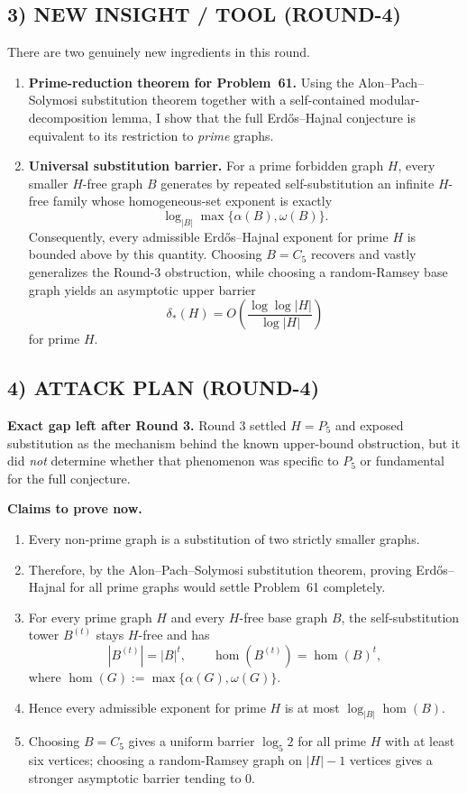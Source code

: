 \subsection*{3) NEW INSIGHT / TOOL (ROUND-4)}
There are two genuinely new ingredients in this round.

\begin{enumerate}
\item \textbf{Prime-reduction theorem for Problem~61.}
Using the Alon--Pach--Solymosi substitution theorem together with a self-contained modular-decomposition lemma, I show that the full Erd\H{o}s--Hajnal conjecture is equivalent to its restriction to \emph{prime} graphs.

\item \textbf{Universal substitution barrier.}
For a prime forbidden graph $H$, every smaller $H$-free graph $B$ generates by repeated self-substitution an infinite $H$-free family whose homogeneous-set exponent is exactly
\[
\log_{|B|}\max\{\alpha(B),\omega(B)\}.
\]
Consequently, every admissible Erd\H{o}s--Hajnal exponent for prime $H$ is bounded above by this quantity.
Choosing $B=C_5$ recovers and vastly generalizes the Round-3 obstruction, while choosing a random-Ramsey base graph yields an asymptotic upper barrier
\[
\delta_*(H)=O\!\left(\frac{\log\log |H|}{\log |H|}\right)
\]
for prime $H$.
\end{enumerate}

\subsection*{4) ATTACK PLAN (ROUND-4)}
\textbf{Exact gap left after Round 3.}
Round 3 settled $H=P_5$ and exposed substitution as the mechanism behind the known upper-bound obstruction, but it did \emph{not} determine whether that phenomenon was specific to $P_5$ or fundamental for the full conjecture.

\textbf{Claims to prove now.}
\begin{enumerate}
\item Every non-prime graph is a substitution of two strictly smaller graphs.
\item Therefore, by the Alon--Pach--Solymosi substitution theorem, proving Erd\H{o}s--Hajnal for all prime graphs would settle Problem~61 completely.
\item For every prime graph $H$ and every $H$-free base graph $B$, the self-substitution tower $B^{(t)}$ stays $H$-free and has
\[
|B^{(t)}|=|B|^t,\qquad \hom(B^{(t)})=\hom(B)^t,
\]
where $\hom(G):=\max\{\alpha(G),\omega(G)\}$.
\item Hence every admissible exponent for prime $H$ is at most $\log_{|B|}\hom(B)$.
\item Choosing $B=C_5$ gives a uniform barrier $\log_5 2$ for all prime $H$ with at least six vertices; choosing a random-Ramsey graph on $|H|-1$ vertices gives a stronger asymptotic barrier tending to $0$.
\end{enumerate}

